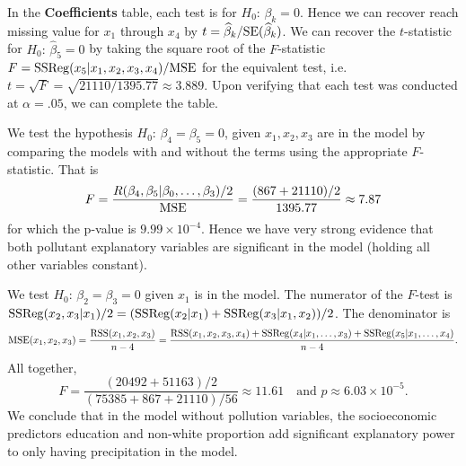 \documentclass{homework}
\begin{document}
\begin{longproblem}
\begin{solution}
 In the \textbf{Coefficients} table, each test is for $H_0:\,\beta_k =0$. Hence we can recover reach missing value for $x_1$ through $x_4$ by $t = \widehat\beta_k/\mathrm{SE}(\widehat\beta_k)$.  We can recover the $t$-statistic for $H_0:\,\hat\beta_5 = 0$ by taking the square root of the $F$-statistic $F=\mathrm{SSReg}(x_5|x_1,x_2,x_3,x_4)/\mathrm{MSE}$ for the equivalent test, i.e. $t = \sqrt{F} = \sqrt{21110/1395.77} \approx 3.889$.  Upon verifying that each test was conducted at $\alpha = .05$, we can complete the table.
\end{solution}

\begin{solution}
  We test the hypothesis $H_0:\, \beta_4=\beta_5=0$, given $x_1,x_2,x_3$ are in the model by comparing the models with and without the terms using the appropriate $F$-statistic.  That is 
  $$
    F = \frac{R(\beta_4,\beta_5|\beta_0,\dots,\beta_3)/2}{\mathrm{MSE}} = \frac{(867+21110)/2}{1395.77} \approx 7.87
  $$
  for which the p-value is $9.99\times10^{-4}$.  Hence we have very strong evidence that both pollutant explanatory variables are significant in the model (holding all other variables constant).
\end{solution}

\begin{solution}
  We test $H_0:\,\beta_2 = \beta_3 = 0$ given $x_1$ is in the model.  The
  numerator of the $F$-test is $\mathrm{SSReg}(x_2,x_3|x_1)/2 = (\mathrm{SSReg}(x_2|x_1) + \mathrm{SSReg}(x_3|x_1,x_2))/2$. The
  denominator is 
  {\small
  $$
    \mathrm{MSE}(x_1,x_2,x_3) = \frac{\mathrm{RSS}(x_1,x_2,x_3)}{n-4} = \frac{\mathrm{RSS}(x_1,x_2,x_3,x_4) + \mathrm{SSReg}(x_4|x_1,\dots,x_3) + \mathrm{SSReg}(x_5|x_1,\dots,x_4)}{n-4}.
  $$ }
  All together,
  $$
    F = \frac{(20492 + 51163)/2}{(75385 + 867 + 21110)/56} \approx 11.61\quad\text{and }p\approx6.03\times 10^{-5}.
  $$
  We conclude that in the model without pollution variables, the socioeconomic
  predictors education and non-white proportion add significant explanatory
  power to only having precipitation in the model.
\end{solution}
\end{longproblem}
\end{document}
